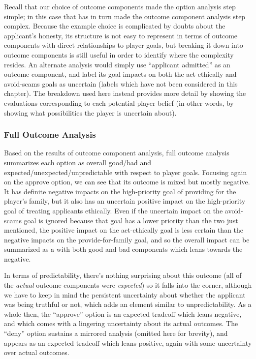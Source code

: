 Recall that our choice of outcome components made the option analysis step simple; in this case that has in turn made the outcome component analysis step complex.
%
Because the example choice is complicated by doubts about the applicant's honesty, its structure is not easy to represent in terms of outcome components with direct relationships to player goals, but breaking it down into outcome components is still useful in order to identify where the complexity resides.
%
An alternate analysis would simply use ``applicant admitted'' as an outcome component, and label its goal-impacts on both the act-ethically and avoid-scams goals as uncertain (labels which have not been considered in this chapter).
%
The breakdown used here instead provides more detail by showing the evaluations corresponding to each potential player belief (in other words, by showing what possibilities the player is uncertain about).

\subsubsection{Full Outcome Analysis}

Based on the results of outcome component analysis, full outcome analysis summarizes each option as overall good/bad and expected/unexpected/unpredictable with respect to player goals.
%
Focusing again on the approve option, we can see that its outcome is mixed but mostly negative.
%
It has definite negative impacts on the high-priority goal of providing for the player's family, but it also has an uncertain positive impact on the high-priority goal of treating applicants ethically.
%
Even if the uncertain impact on the avoid-scams goal is ignored because that goal has a lower priority than the two just mentioned, the positive impact on the act-ethically goal is less certain than the negative impacts on the provide-for-family goal, and so the overall impact can be summarized as a  with both good and bad components which leans towards the negative.


In terms of predictability, there's nothing surprising about this outcome (all of the \emph{actual} outcome components were \emph{expected}) so it falls into the  corner, although we have to keep in mind the persistent uncertainty about whether the applicant was being truthful or not, which adds an element similar to unpredictability.
%
As a whole then, the ``approve'' option is an expected tradeoff which leans negative, and which comes with a lingering uncertainty about its actual outcomes.
%
The ``deny'' option sustains a mirrored analysis (omitted here for brevity), and appears as an expected tradeoff which leans positive, again with some uncertainty over actual outcomes.


